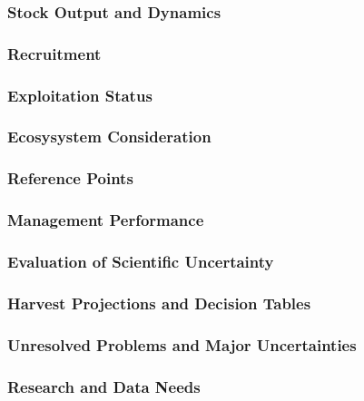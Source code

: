 \documentclass[
]{scrartcl}
\begin{document}
\subsubsection{Stock Output and
Dynamics}\label{stock-output-and-dynamics}

\subsubsection{Recruitment}\label{recruitment}

\subsubsection{Exploitation Status}\label{exploitation-status}

\subsubsection{Ecosysystem
Consideration}\label{ecosysystem-consideration}

\subsubsection{Reference Points}\label{reference-points}

\subsubsection{Management Performance}\label{management-performance}

\subsubsection{Evaluation of Scientific
Uncertainty}\label{evaluation-of-scientific-uncertainty}

\subsubsection{Harvest Projections and Decision
Tables}\label{harvest-projections-and-decision-tables}

\subsubsection{Unresolved Problems and Major
Uncertainties}\label{unresolved-problems-and-major-uncertainties}

\subsubsection{Research and Data Needs}\label{research-and-data-needs}
\end{document}
